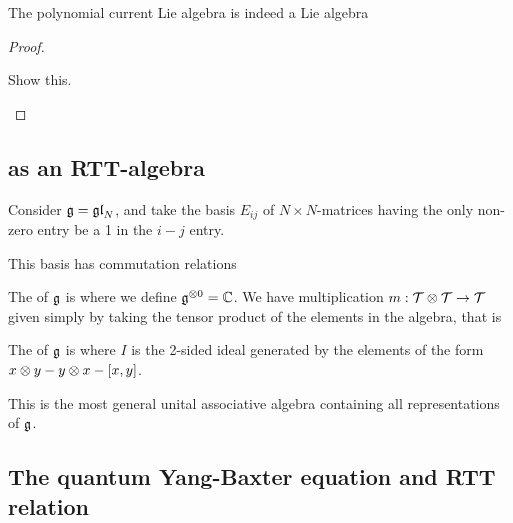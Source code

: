 \documentclass{article}
\begin{document}
\begin{prop}
The polynomial current Lie algebra is indeed a Lie algebra
\end{prop}
\begin{proof}
\begin{ex}
Show this. 
\end{ex}
\end{proof}

\subsection{ as an RTT-algebra}

Consider $\mf{g} = \mf{gl}_N$, and take the basis $E_{ij}$ of $N \times N$-matrices having the only non-zero entry be a 1 in the $i-j$ entry. 

\begin{fact}
This basis has commutation relations 
\end{fact}

\begin{definition}
The  of $\mf{g}$ is 
where we define $\mf{g}^{\otimes 0} = \mbb{C}$. We have multiplication $m:\mc{T} \otimes \mc{T} \to \mc{T}$ given simply by taking the tensor product of the elements in the algebra, that is 
\end{definition}

\begin{definition}
The  of $\mf{g}$ is
where $I$ is the 2-sided ideal generated by the elements of the form $x \otimes y - y \otimes x - \comm[x]{y}$. 
\end{definition}

\begin{remark}
This is the most general unital associative algebra containing all representations of $\mf{g}$. 
\end{remark}

\subsection{The quantum Yang-Baxter equation and RTT relation}
\end{document}
